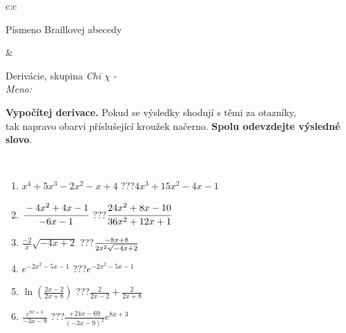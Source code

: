 \documentclass[10pt]{report}
\begin{document}
\begin{tabular}{c:c}
\begin{minipage}[c][104.5mm][t]{0.5\linewidth}
\begin{center}
\begin{minipage}{0.20\linewidth}
\begin{center}
{\small Písmeno Braillovej abecedy}
\end{center}
\end{minipage}
\end{center}
\end{minipage}
&
\begin{minipage}[c][104.5mm][t]{0.5\linewidth}
\begin{center}
\vspace{7mm}
{\huge Derivácie, skupina \textit{Chi $\chi$} -}\\[5mm]
\textit{Meno:}\phantom{xxxxxxxxxxxxxxxxxxxxxxxxxxxxxxxxxxxxxxxxxxxxxxxxxxxxxxxxxxxxxxxxx}\\[5mm]
\begin{minipage}{0.95\linewidth}
\begin{center}
\textbf{Vypočítej derivace.} Pokud se výsledky shodují s těmi za otazníky,\\tak napravo obarvi příslušející kroužek načerno. \textbf{Spolu odevzdejte výsledné slovo}.
\end{center}
\end{minipage}
\\[1mm]
\begin{minipage}{0.79\linewidth}
\begin{center}
\begin{varwidth}{\linewidth}
\begin{enumerate}
\normalsize
\item $x^4+5x^3-2x^2-x+4$\quad \dotfill\; ???\;\dotfill \quad $4x^3+15x^2-4x-1$
\item $\cfrac{-4x^2+4x-1}{-6x-1}$\quad \dotfill\; ???\;\dotfill \quad $\cfrac{24x^2+8x-10}{36x^2+12x+1}$
\item $\frac{-2}{x}\sqrt{-4x+2}$\quad \dotfill\; ???\;\dotfill \quad $\frac{-8x+8}{2x^2 \sqrt{\smash[b]{-4x+2}}}$
\item $e^{-2x^2-5x-1}$\quad \dotfill\; ???\;\dotfill \quad $e^{-2x^2-5x-1}$
\item $\ln{\left(\frac{2x-2}{2x+8}\right)}$\quad \dotfill\; ???\;\dotfill \quad $\frac{2}{2x-2}+\frac{2}{2x+8}$
\item $\frac{e^{8x+3}}{-3x-9}$\quad \dotfill\; ???\;\dotfill \quad $\frac{+24x-69}{(-3x-9)^2}e^{8x+3}$
\end{enumerate}
\end{varwidth}
\end{center}
\end{minipage}
\begin{minipage}{0.20\linewidth}
\begin{center}

\end{center}
\end{minipage}
\end{center}
\end{minipage}
\end{tabular}
\end{document}
